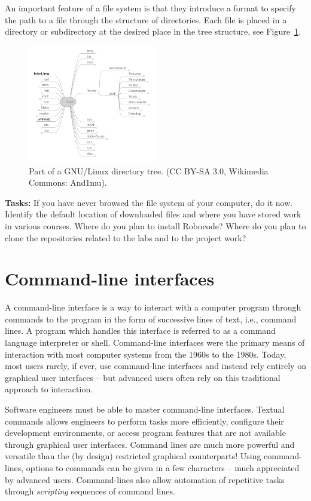 \documentclass{scrreprt}
\begin{document}
An important feature of a file system is that they introduce a format to specify the path to a file through the structure of directories. Each file is placed in a directory or subdirectory at the desired place in the tree structure, see Figure~\ref{fig:tree}.\\

\begin{figure}
\centering
\includegraphics[width=0.5\textwidth]{figures/GNU-Linux_directory_tree.png}
\caption{Part of a GNU/Linux directory tree. (CC BY-SA 3.0, Wikimedia Commons: And1mu).}
\label{fig:tree}
\end{figure}

\textbf{Tasks:} If you have never browsed the file system of your computer, do it now. Identify the default location of downloaded files and where you have stored work in various courses. Where do you plan to install Robocode? Where do you plan to clone the repositories related to the labs and to the project work? 

\chapter{Command-line interfaces}
A command-line interface is a way to interact with a computer program through  commands to the program in the form of successive lines of text, i.e., command lines. A program which handles this interface is referred to as a command language interpreter or shell. Command-line interfaces were the primary means of interaction with most computer systems from the 1960s to the 1980s. Today, most users rarely, if ever, use command-line interfaces and instead rely entirely on graphical user interfaces -- but advanced users often rely on this traditional approach to interaction.

Software engineers must be able to master command-line interfaces. Textual commands allows engineers to perform tasks more efficiently, configure their development environments, or access program features that are not available through graphical user interfaces. Command lines are much more powerful and versatile than the (by design) restricted graphical counterparts! Using command-lines, options to commands can be given in a few characters -- much appreciated by advanced users. Command-lines also allow automation of repetitive tasks through \textit{scripting} sequences of command lines.
\end{document}
